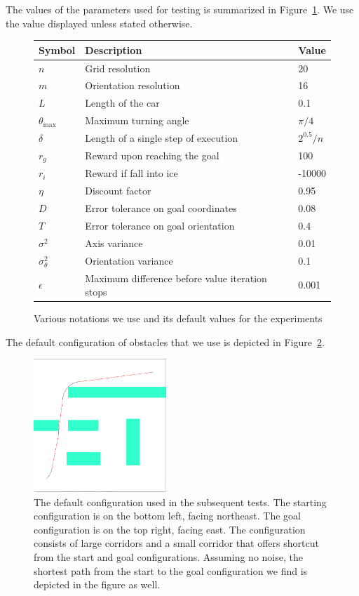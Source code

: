 \documentclass[a4paper]{article}
\begin{document}
The values of the parameters used for testing is summarized in Figure~\ref{f:notations}.
We use the value displayed unless stated otherwise.

\begin{figure}
\caption{Various notations we use and its default values for the experiments}
\label{f:notations}
\begin{tabular}{ l | l | l }
  Symbol & Description & Value \\ \hline \hline
  $n$ & Grid resolution & 20 \\ \hline
  $m$ & Orientation resolution & 16 \\ \hline
  $L$ & Length of the car & 0.1 \\ \hline
  $\theta_{\text{max}}$ & Maximum turning angle & $\pi / 4$ \\ \hline
  $\delta$ & Length of a single step of execution & $2^{0.5} / n$ \\ \hline
  $r_g$ & Reward upon reaching the goal & 100 \\ \hline
  $r_i$ & Reward if fall into ice & -10000 \\ \hline
  $\eta$ & Discount factor & 0.95 \\ \hline
  $D$ & Error tolerance on goal coordinates & 0.08 \\ \hline
  $T$ & Error tolerance on goal orientation & 0.4 \\ \hline
  $\sigma^2$ & Axis variance & 0.01 \\ \hline
  $\sigma_\theta^2$ & Orientation variance & 0.1 \\ \hline
  $\epsilon$ & Maximum difference before value iteration stops & 0.001 \\ \hline
\end{tabular}
\end{figure}

The default configuration of obstacles that we use is depicted in
Figure~\ref{f:b_shortest}.

\begin{figure}
\caption{The default configuration used in the subsequent tests. The starting
  configuration is on the bottom left, facing northeast. The goal configuration
  is on the top right, facing east. The configuration consists
  of large corridors and a small corridor that offers shortcut from the start
  and goal configurations. Assuming no noise, the shortest path from the start
to the goal configuration we find is depicted in the figure as well.}
\label{f:b_shortest}
\centerline{\includegraphics[width=5cm]{b_shortest.png}}
\end{figure}
\end{document}
